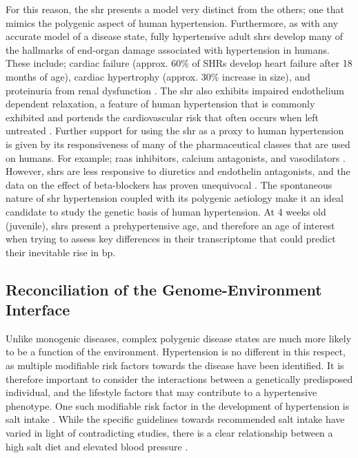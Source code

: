 For this reason, the \acrshort{shr} presents a model very distinct from the others; one that mimics the polygenic aspect of human hypertension. Furthermore, as with any accurate model of a disease state, fully hypertensive adult \acrshort{shr}s develop many of the hallmarks of end-organ damage associated with hypertension in humans. These include; cardiac failure (approx. 60\% of SHRs develop heart failure after 18 months of age), cardiac hypertrophy (approx. 30\% increase in size), and proteinuria from renal dysfunction \cite{Pinto1998,Conrad1991,Pfeffer1979}. The \acrshort{shr} also exhibits impaired endothelium dependent relaxation, a feature of human hypertension that is commonly exhibited and portends the cardiovascular risk that often occurs when left untreated \cite{Luscher1990}. Further support for using the \acrshort{shr} as a proxy to human hypertension is given by its responsiveness of many of the pharmaceutical classes that are used on humans. For example; \acrfull{raas} inhibitors, calcium antagonists, and vasodilators \cite{Wada1996,Takenaka1985,Limas1984}. However, \acrshort{shr}s are less responsive to diuretics and endothelin antagonists, and the data on the effect of beta-blockers has proven unequivocal \cite{Wada1996, Limas1984, Karam1996}. The spontaneous nature of \acrshort{shr} hypertension coupled with its polygenic aetiology make it an ideal candidate to study the genetic basis of human hypertension. At 4 weeks old (juvenile), \acrshort{shr}s present a prehypertensive age, and therefore an age of interest when trying to assess key differences in their transcriptome that could predict their inevitable rise in \acrshort{bp}. 

\subsection{Reconciliation of the Genome-Environment Interface}

Unlike monogenic diseases, complex polygenic disease states are much more likely to be a function of the environment. Hypertension is no different in this respect, as multiple modifiable risk factors towards the disease have been identified. It is therefore important to consider the interactions between a genetically predisposed individual, and the lifestyle factors that may contribute to a hypertensive phenotype. One such modifiable risk factor in the development of hypertension is salt intake \cite{Stamler1997}. While the specific guidelines towards recommended salt intake have varied in light of contradicting studies, there is a clear relationship between a high salt diet and elevated blood pressure \cite{Ha2014}.  

